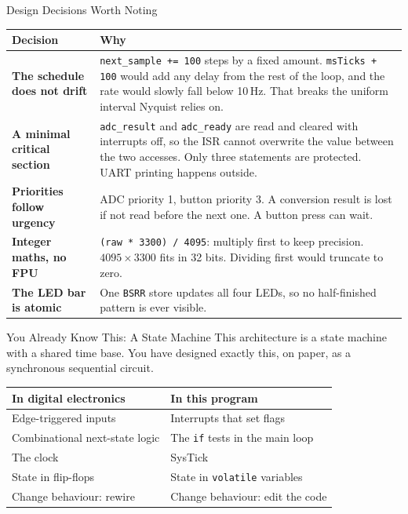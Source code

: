 \documentclass[9pt,aspectratio=169,xcolor=table]{beamer}
\begin{document}
\begin{frame}{Design Decisions Worth Noting}
    \begin{center}
    {\footnotesize
    \striped
    \begin{tabular}{@{}l R{.7\textwidth}@{}}
        \toprule
        \textbf{Decision} & \textbf{Why} \\
        \midrule
        \textbf{The schedule does not drift} & \texttt{next\_sample += 100} steps by a fixed amount. \texttt{msTicks + 100} would add any delay from the rest of the loop, and the rate would slowly fall below 10\,Hz. That breaks the uniform interval Nyquist relies on. \\
        \textbf{A minimal critical section} & \texttt{adc\_result} and \texttt{adc\_ready} are read and cleared with interrupts off, so the ISR cannot overwrite the value between the two accesses. Only three statements are protected. UART printing happens outside. \\
        \textbf{Priorities follow urgency} & ADC priority 1, button priority 3. A conversion result is lost if not read before the next one. A button press can wait. \\
        \textbf{Integer maths, no FPU} & \texttt{(raw * 3300) / 4095}: multiply first to keep precision. $4095\times3300$ fits in 32 bits. Dividing first would truncate to zero. \\
        \textbf{The LED bar is atomic} & One \texttt{BSRR} store updates all four LEDs, so no half-finished pattern is ever visible. \\
        \bottomrule
    \end{tabular}}
    \end{center}
\end{frame}

\begin{frame}{You Already Know This: A State Machine}
    \leavevmode
    This architecture is a \alert{state machine with a shared time base}. You have designed exactly this, on paper, as a synchronous sequential circuit.

    \vspace{3mm}
    \begin{center}
    {\small
    \striped
    \begin{tabular}{@{}l l@{}}
        \toprule
        \textbf{In digital electronics} & \textbf{In this program} \\
        \midrule
        Edge-triggered inputs & Interrupts that set flags \\
        Combinational next-state logic & The \texttt{if} tests in the main loop \\
        The clock & SysTick \\
        State in flip-flops & State in \texttt{volatile} variables \\
        Change behaviour: rewire & Change behaviour: \alert{edit the code} \\
        \bottomrule
    \end{tabular}}
    \end{center}
\end{frame}
\end{document}
